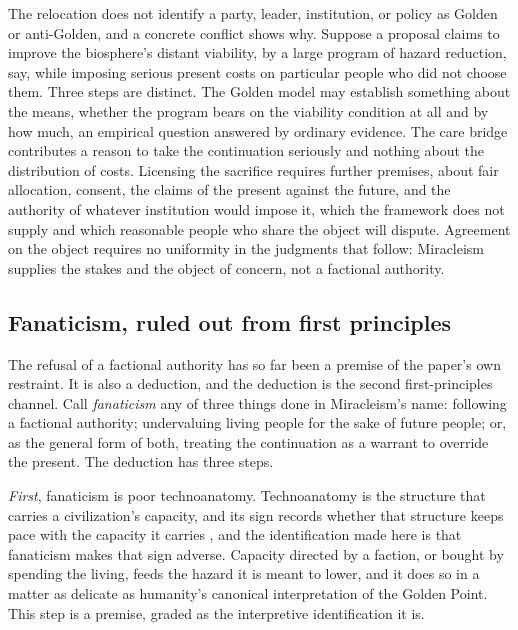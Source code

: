 The relocation does not identify a party, leader, institution, or policy as
Golden or anti-Golden, and a concrete conflict shows why. Suppose a proposal
claims to improve the biosphere's distant viability, by a large program of
hazard reduction, say, while imposing serious present costs on particular
people who did not choose them. Three steps are distinct. The Golden model may
establish something about the means, whether the program bears on the
viability condition at all and by how much, an empirical question answered by
ordinary evidence. The care bridge contributes a reason to take the
continuation seriously and nothing about the distribution of costs. Licensing
the sacrifice requires further premises, about fair allocation, consent, the
claims of the present against the future, and the authority of whatever
institution would impose it, which the framework does not supply and which
reasonable people who share the object will dispute. Agreement on the object
requires no uniformity in the judgments that follow: Miracleism supplies the
stakes and the object of concern, not a factional authority.

\subsection*{Fanaticism, ruled out from first principles}

The refusal of a factional authority has so far been a premise of the paper's
own restraint. It is also a deduction, and the deduction is the second
first-principles channel. Call \emph{fanaticism} any of three things done in
Miracleism's name: following a factional authority; undervaluing living
people for the sake of future people; or, as the general form of both,
treating the continuation as a warrant to override the present. The
deduction has three steps.

\emph{First}, fanaticism is poor technoanatomy. Technoanatomy is the structure
that carries a civilization's capacity, and its sign records whether that structure keeps pace with the capacity it carries
\cite{GoldenTechnoanatomy}, and the identification made here is that
fanaticism makes that sign adverse. Capacity directed by a faction, or bought
by spending the living, feeds the hazard it is meant to lower, and it does so
in a matter as delicate as humanity's canonical interpretation of the Golden
Point. This step is a
premise, graded as the interpretive identification it is.

